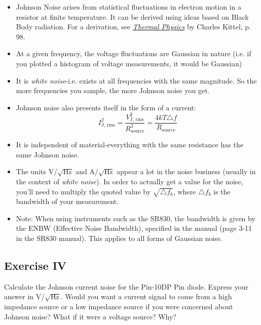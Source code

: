 \documentclass{../lab}
\begin{document}
\begin{itemize}
    \item Johnson Noise arises from statistical fluctuations in electron motion in a resistor at finite temperature. It can be derived using ideas based on Black Body radiation. For a derivation, see \href{https://drive.google.com/file/d/1PRz8X9WIDkVBk5ikSWJV7HmI-QDSjUg3/view?usp=drive_link}{\emph{Thermal Physics}} by Charles Kittel, p. 98.

    \item At a given frequency, the voltage fluctuations are Gaussian in nature (i.e. if you plotted a histogram of voltage measurements, it would be Gaussian)

    \item It is \emph{white noise}-i.e. exists at all frequencies with the same magnitude. So the more frequencies you sample, the more Johnson noise you get.

    \item Johnson noise also presents itself in the form of a current:
    \[
    I_\text{J, rms}^2 = \frac{V_\text{J, rms}^2}{R_\text{source}^2} = \frac{4kT\triangle f}{R_\text{source}}
    \]

    \item It is independent of material-everything with the same resistance has the same Johnson noise.

    \item The units V/$\sqrt{\text{Hz}}$ and A/$\sqrt{\text{Hz}}$ appear a lot in the noise business (usually in the context of \emph{white noise}). In order to actually get a value for the noise, you'll need to multiply the quoted value by $\sqrt{\triangle f_b}$, where $\triangle f_b$ is the bandwidth of your measurement.

    \item Note: When using instruments such as the SR830, the bandwidth is given by the ENBW (Effective Noise Bandwidth), specified in the manual (page 3-11 in the SR830 manual). This applies to all forms of Gaussian noise.

\end{itemize}

\subsection{Exercise IV}

Calculate the Johnson current noise for the Pin-10DP Pin diode. Express your answer in V/$\sqrt{\text{Hz}}$. Would you want a current signal to come from a high impedance source or a low impedance source if you were concerned about Johnson noise? What if it were a voltage source? Why?
\end{document}
